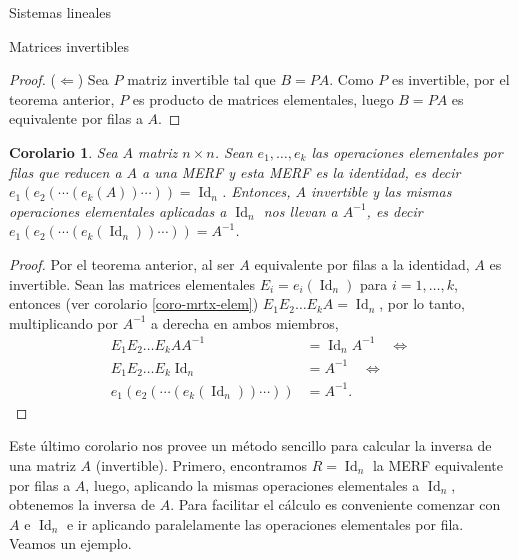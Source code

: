 \documentclass[a4paper,12pt,twoside,spanish,reqno]{amsbook}
\numberwithin{equation}{section}
\newtheorem{corolario}[teorema]{Corolario}
\theoremstyle{definition}
\theoremstyle{remark}
\newcommand{\Id}{\operatorname{Id}}
\begin{document}
\begin{chapter}{Sistemas lineales}
\begin{section}{Matrices invertibles}
\begin{proof}
                ($\Leftarrow$) Sea  $P$  matriz invertible tal que $B =PA$. Como $P$ es invertible, por el teorema anterior, $P$ es producto de matrices elementales, luego $B =PA$ es equivalente por filas a $A$.
            \end{proof}	
            
            \begin{corolario}\label{mtrx-inv-gauss}
                Sea $A$ matriz $n \times n$. Sean $e_1,\ldots,e_k$ las operaciones elementales por filas que reducen a $A$  a una MERF y esta MERF es la identidad,  es decir $e_1(e_{2}(\cdots(e_k(A))\cdots)) =\Id_n$. Entonces, $A$ invertible y  las mismas operaciones elementales aplicadas a $\Id_n$ nos llevan a $A^{-1}$,  es decir $e_1(e_{2}(\cdots(e_k(\Id_n))\cdots)) =A^{-1}$.
            \end{corolario}
            \begin{proof} Por el teorema anterior, al ser $A$ equivalente por filas a la identidad, $A$ es invertible.  
                Sean las matrices elementales  $E_i = e_i(\Id_n)$ para $i=1,\ldots,k$,  entonces (ver corolario \ref{coro-mrtx-elem}) $E_1E_2\ldots E_kA = \Id_n$, por lo tanto, multiplicando por $A^{-1}$ a derecha en ambos miembros,    
                \begin{align*}
                E_1E_2\ldots E_kA A^{-1}&= \Id_nA^{-1} \quad \Leftrightarrow \\
                E_1E_2\ldots E_k\Id_n&= A^{-1} \quad \Leftrightarrow \\
                e_1(e_{2}(\cdots(e_k(\Id_n))\cdots)) &=A^{-1}.
                \end{align*}
            \end{proof}
            
            Este último corolario nos provee un método sencillo para calcular la inversa de una matriz $A$ (invertible). Primero,  encontramos $R = \Id_n$ la MERF  equivalente por filas a $A$, luego, aplicando la mismas operaciones elementales a $\Id_n$, obtenemos la inversa de $A$. Para facilitar el cálculo es  conveniente comenzar con $A$ e $\Id_n$ e ir aplicando paralelamente las operaciones elementales por fila. Veamos un ejemplo.


\end{section}
\end{chapter}
\end{document}
